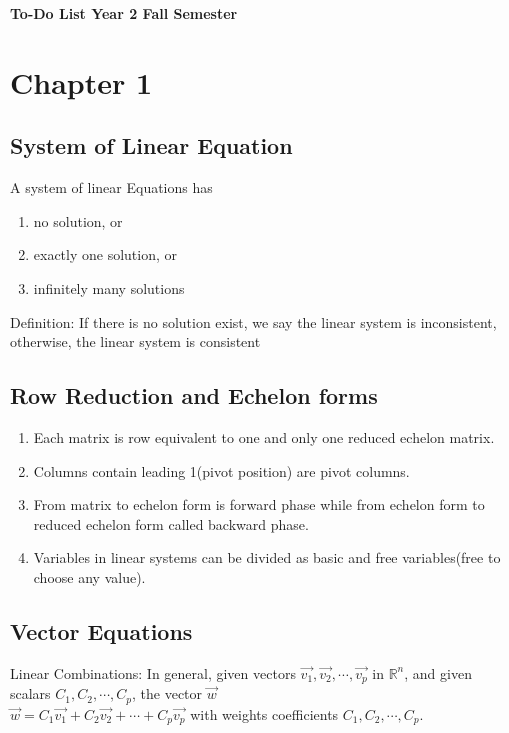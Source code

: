 \documentclass[12pt]{article}
\begin{document}
\begin{center}
\vspace{0.6cm}
{\Large \bf To-Do List Year 2 Fall Semester}
\vspace{0.3cm}
\end{center}

\section{Chapter 1}
\subsection{System of Linear Equation}
A system of linear Equations has
\begin{enumerate}
    \item no solution, or
    \item exactly one solution, or
    \item infinitely many solutions
\end{enumerate}
Definition: If there is no solution exist, we say the linear system is inconsistent, otherwise, the linear system is consistent

\subsection{Row Reduction and Echelon forms}
\begin{enumerate}
    \item Each matrix is row equivalent to one and only one reduced echelon matrix.
    \item Columns contain leading 1(pivot position) are pivot columns.
    \item From matrix to echelon form is forward phase while from echelon form to reduced echelon form called backward phase.
    \item Variables in linear systems can be divided as basic and free variables(free to choose any value).
\end{enumerate}
\subsection{Vector Equations}
Linear Combinations: In general, given vectors $\vec{v_1}, \vec{v_2}, \cdots, \vec{v_p}$ in $\mathbb{R}^n$, and given scalars $C_1, C_2, \cdots, C_p$, the vector $\vec{w}$\\
$\vec{w} = C_1 \vec{v_1} + C_2 \vec{v_2} + \cdots + C_p \vec{v_p}$ with weights coefficients $C_1, C_2, \cdots, C_p$. 
\end{document}
